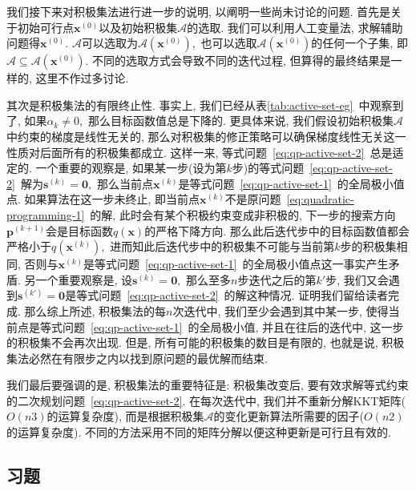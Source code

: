 \documentclass{SBCbookchapter}
\newcommand{\V}[1]{{\bm{#1}}}
\numberwithin{equation}{section}
\begin{document}
我们接下来对积极集法进行进一步的说明, 以阐明一些尚未讨论的问题. 首先是关于初始可行点$\V{x}^{(0)}$以及初始积极集$\mathcal{A}$的选取. 我们可以利用人工变量法, 求解辅助问题得$\V{x}^{(0)}.$ $\mathcal{A}$可以选取为$\mathcal{A}(\V{x}^{(0)}),$ 也可以选取$\mathcal{A}(\V{x}^{(0)})$的任何一个子集, 即$\mathcal{A} \subseteq \mathcal{A}(\V{x}^{(0)}).$ 不同的选取方式会导致不同的迭代过程, 但算得的最终结果是一样的, 这里不作过多讨论.

其次是积极集法的有限终止性. 事实上, 我们已经从表\ref{tab:active-set-eg}~中观察到了, 如果$\alpha_k \neq 0,$ 那么目标函数值总是下降的. 更具体来说, 我们假设初始积极集$\mathcal{A}$中约束的梯度是线性无关的, 那么对积极集的修正策略可以确保梯度线性无关这一性质对后面所有的积极集都成立. 这样一来, 等式问题~\eqref{eq:qp-active-set-2}~总是适定的. 一个重要的观察是, 如果某一步(设为第$k$步)的等式问题~\eqref{eq:qp-active-set-2}~解为$\V{s}^{(k)} = \V{0},$ 那么当前点$\V{x}^{(k)}$是等式问题~\eqref{eq:qp-active-set-1}~的全局极小值点. 如果算法在这一步未终止, 即当前点$\V{x}^{(k)}$不是原问题~\eqref{eq:quadratic-programming-1}~的解, 此时会有某个积极约束变成非积极的, 下一步的搜索方向$\V{p}^{(k+1)}$会是目标函数$q(\V{x})$的严格下降方向. 那么此后迭代步中的目标函数值都会严格小于$q(\V{x}^{(k)}),$ 进而知此后迭代步中的积极集不可能与当前第$k$步的积极集相同, 否则与$\V{x}^{(k)}$是等式问题~\eqref{eq:qp-active-set-1}~的全局极小值点这一事实产生矛盾. 另一个重要观察是, 设$\V{s}^{(k)} = \V{0},$ 那么至多$n$步迭代之后的第$k'$步, 我们又会遇到$\V{s}^{(k')} = \V{0}$是等式问题~\eqref{eq:qp-active-set-2}~的解这种情况. 证明我们留给读者完成. 那么综上所述, 积极集法的每$n$次迭代中, 我们至少会遇到其中某一步, 使得当前点是等式问题~\eqref{eq:qp-active-set-1}~的全局极小值, 并且在往后的迭代中, 这一步的积极集不会再次出现. 但是, 所有可能的积极集的数目是有限的, 也就是说, 积极集法必然在有限步之内以找到原问题的最优解而结束.

我们最后要强调的是, 积极集法的重要特征是: 积极集改变后, 要有效求解等式约束的二次规划问题~\eqref{eq:qp-active-set-2}. 在每次迭代中, 我们并不重新分解KKT矩阵($O(n3)$的运算复杂度), 而是根据积极集$\mathcal{A}$的变化更新算法所需要的因子($O(n2)$的运算复杂度). 不同的方法采用不同的矩阵分解以便这种更新是可行且有效的.


\subsection*{习题}
\end{document}
